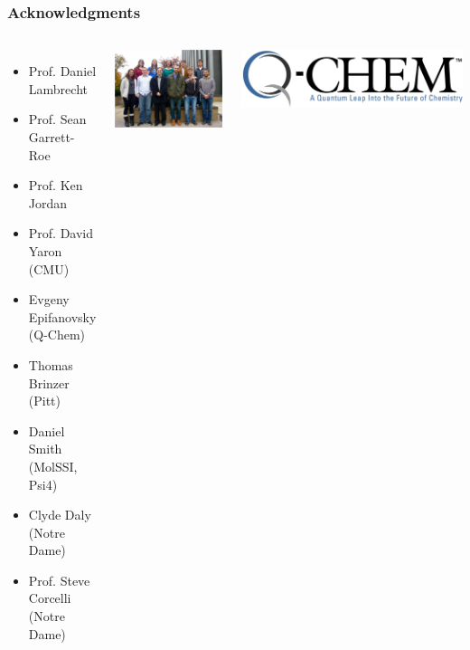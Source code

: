 \documentclass[%
    xcolor=usenames,dvipsnames,svgnames%
]{beamer}
\begin{document}
\begin{frame}
  \frametitle{Acknowledgments}
  \begin{columns}
    \begin{minipage}{1.0\linewidth}
      \scriptsize
      \begin{itemize}
      \item Prof. Daniel Lambrecht
      \item Prof. Sean Garrett-Roe
      \item Prof. Ken Jordan
      \item Prof. David Yaron (CMU)
      \item Evgeny Epifanovsky (Q-Chem)
      \item Thomas Brinzer (Pitt)
      \item Daniel Smith (MolSSI, Psi4)
      \item Clyde Daly (Notre Dame)
      \item Prof. Steve Corcelli (Notre Dame)
      \end{itemize}
      \includegraphics[scale=0.38]{./figures/lambrecht_group.png}
    \end{minipage}
    \begin{minipage}{1.0\linewidth}
      \centering
      \includegraphics[width=1.00\linewidth,keepaspectratio]{./figures/Qchem-logo.png}

\end{minipage}
\end{columns}
\end{frame}
\end{document}
